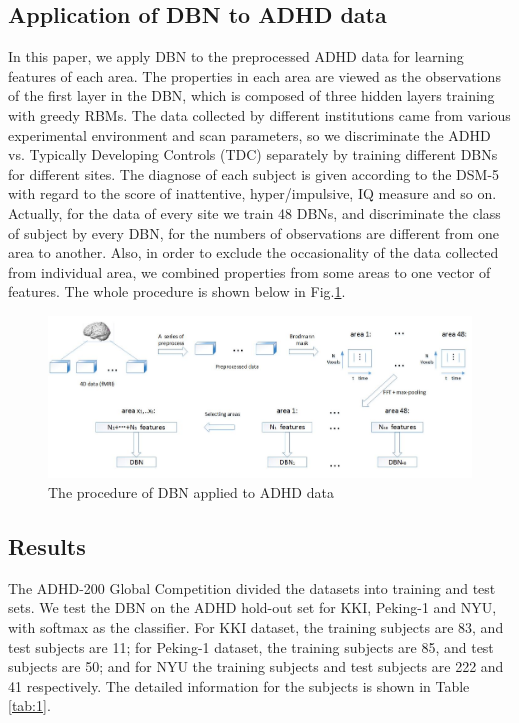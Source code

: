 \documentclass{llncs}
\begin{document}
\subsection{Application of DBN to ADHD data}
In this paper, we apply DBN to the preprocessed ADHD data for learning features of each area. The properties in each area are viewed as the observations of the first layer in the DBN, which is composed of three hidden layers training with greedy RBMs. The data collected by different institutions came from various experimental environment and scan parameters, so we discriminate the ADHD vs. Typically Developing Controls (TDC) separately by training different DBNs for different sites. The diagnose of each subject is given according to the DSM-5 with regard to the score of inattentive, hyper/impulsive, IQ measure and so on. Actually, for the data of every site we train 48 DBNs, and discriminate the class of subject by every DBN, for the numbers of observations are different from one area to another. Also, in order to exclude the occasionality of the data collected from individual area, we combined properties from some areas to one vector of features. The whole procedure is shown below in Fig.\ref{fig:3}.
\begin{figure}[!htbp]
	\centering
		\includegraphics[scale=0.30]{figs/procedure.jpg}
    	\caption{The procedure of DBN applied to ADHD data}
    	    	\label{fig:3} 
\end{figure}


\subsection{Results}
The ADHD-200 Global Competition divided the datasets into training and test sets. We test the DBN on the ADHD hold-out set for KKI, Peking-1 and NYU, with softmax as the classifier. For KKI dataset, the training subjects are 83, and test subjects are 11; for Peking-1 dataset, the training subjects are 85, and test subjects are 50; and for NYU the training subjects and test subjects are 222 and 41 respectively. The detailed information for the subjects is shown in Table \ref{tab:1}.
\end{document}
